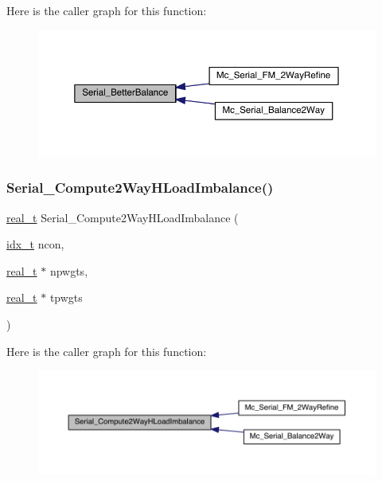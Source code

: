 Here is the caller graph for this function\+:\nopagebreak
\begin{figure}[H]
\begin{center}
\leavevmode
\includegraphics[width=350pt]{a00407_a62ce727c3eee17b8d8add92ffeb8adbe_icgraph}
\end{center}
\end{figure}
\mbox{\label{a00407_afa6aadaf308fc164c98e67d2511daf03}} 
\subsubsection{\texorpdfstring{Serial\+\_\+\+Compute2\+Way\+H\+Load\+Imbalance()}{Serial\_Compute2WayHLoadImbalance()}}
{\footnotesize\ttfamily \hyperlink{a00876_a1924a4f6907cc3833213aba1f07fcbe9}{real\+\_\+t} Serial\+\_\+\+Compute2\+Way\+H\+Load\+Imbalance (\begin{DoxyParamCaption}\item[{\hyperlink{a00876_aaa5262be3e700770163401acb0150f52}{idx\+\_\+t}}]{ncon,  }\item[{\hyperlink{a00876_a1924a4f6907cc3833213aba1f07fcbe9}{real\+\_\+t} $\ast$}]{npwgts,  }\item[{\hyperlink{a00876_a1924a4f6907cc3833213aba1f07fcbe9}{real\+\_\+t} $\ast$}]{tpwgts }\end{DoxyParamCaption})}

Here is the caller graph for this function\+:\nopagebreak
\begin{figure}[H]
\begin{center}
\leavevmode
\includegraphics[width=350pt]{a00407_afa6aadaf308fc164c98e67d2511daf03_icgraph}
\end{center}
\end{figure}
\mbox{\label{a00407_a9f3e61c58695c143989d96c57154fb80}} 
